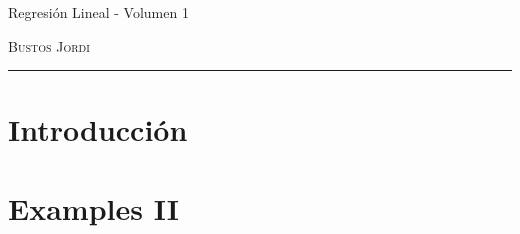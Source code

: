 \documentclass[12pt,a4paper]{book}
\begin{document}
\renewcommand{\contentsname}{\vspace{0cm} Contenido \vspace{-2cm}}

\begin{titlepage}
\vspace*{2cm}

\noindent
\vspace*{0.5cm}

\vspace{1.5cm}
\epigraph{Regresión Lineal - Volumen 1}%
{ \textsc{Bustos Jordi}}
\null\vfill
\vspace*{1cm}
\noindent
\hfill
\begin{minipage}{0.7\linewidth}
    \begin{flushright}
        \printauthor
    \end{flushright}
\end{minipage}
%
\begin{minipage}{0.02\linewidth}
    \rule{1pt}{70pt}
\end{minipage}
\titlepagedecoration
\end{titlepage}

\let\cleardoublepage=\clearpage
\tableofcontents
\blankpage

\chapter{Introducción}

\newpage\thispagestyle{empty}\blankpage

\chapter{Examples II}

\newpage\thispagestyle{empty}\blankpage


\blankpage


\nocite{*}
\end{document}
